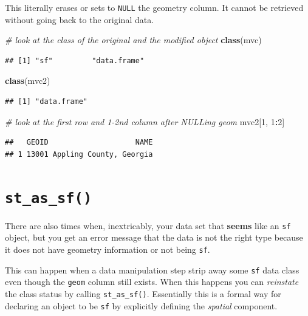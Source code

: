 \documentclass[
]{book}
\newenvironment{Shaded}{\begin{snugshade}}{\end{snugshade}}
\newcommand{\CommentTok}[1]{\textcolor[rgb]{0.56,0.35,0.01}{\textit{#1}}}
\newcommand{\DecValTok}[1]{\textcolor[rgb]{0.00,0.00,0.81}{#1}}
\newcommand{\FunctionTok}[1]{\textcolor[rgb]{0.13,0.29,0.53}{\textbf{#1}}}
\newcommand{\NormalTok}[1]{#1}
\newcommand{\SpecialCharTok}[1]{\textcolor[rgb]{0.81,0.36,0.00}{\textbf{#1}}}
\begin{document}
This literally erases or sets to \texttt{NULL} the geometry column. It cannot be retrieved without going back to the original data.

\begin{Shaded}
\begin{Highlighting}[]
\CommentTok{\# look at the class of the original and the modified object}
\FunctionTok{class}\NormalTok{(mvc)}
\end{Highlighting}
\end{Shaded}

\begin{verbatim}
## [1] "sf"         "data.frame"
\end{verbatim}

\begin{Shaded}
\begin{Highlighting}[]
\FunctionTok{class}\NormalTok{(mvc2)}
\end{Highlighting}
\end{Shaded}

\begin{verbatim}
## [1] "data.frame"
\end{verbatim}

\begin{Shaded}
\begin{Highlighting}[]
\CommentTok{\# look at the first row and 1{-}2nd column after NULLing geom}
\NormalTok{mvc2[}\DecValTok{1}\NormalTok{, }\DecValTok{1}\SpecialCharTok{:}\DecValTok{2}\NormalTok{]}
\end{Highlighting}
\end{Shaded}

\begin{verbatim}
##   GEOID                    NAME
## 1 13001 Appling County, Georgia
\end{verbatim}

\hypertarget{st-as-sf}{%
\section{\texorpdfstring{\texttt{st\_as\_sf()}}{st\_as\_sf()}}\label{st-as-sf}}

There are also times when, inextricably, your data set that \textbf{seems} like an \texttt{sf} object, but you get an error message that the data is not the right type because it does not have geometry information or not being \texttt{sf}.

This can happen when a data manipulation step strip away some \texttt{sf} data class even though the \texttt{geom} column still exists. When this happens you can \emph{reinstate} the class status by calling \texttt{st\_as\_sf()}. Essentially this is a formal way for declaring an object to be \texttt{sf} by explicitly defining the \emph{spatial} component.
\end{document}
